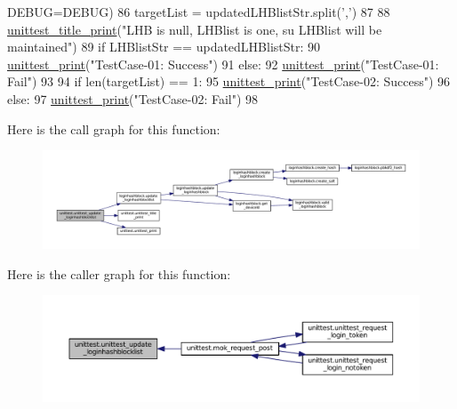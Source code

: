 \begin{DoxyCode}
      DEBUG=DEBUG)
86     targetList = updatedLHBlistStr.split(\textcolor{stringliteral}{','})
87 
88     \hyperlink{namespaceunittest_a642ec5401fe406315f1489d237ba826e}{unittest\_title\_print}(\textcolor{stringliteral}{"LHB is null, LHBlist is one, su LHBlist will be maintained"})
89     \textcolor{keywordflow}{if} LHBlistStr == updatedLHBlistStr:
90         \hyperlink{namespaceunittest_a217a1a3af5bc9748f2f6194bf79402bc}{unittest\_print}(\textcolor{stringliteral}{"TestCase-01: Success"})
91     \textcolor{keywordflow}{else}:
92         \hyperlink{namespaceunittest_a217a1a3af5bc9748f2f6194bf79402bc}{unittest\_print}(\textcolor{stringliteral}{"TestCase-01: Fail"})
93 
94     \textcolor{keywordflow}{if} len(targetList) == 1:
95         \hyperlink{namespaceunittest_a217a1a3af5bc9748f2f6194bf79402bc}{unittest\_print}(\textcolor{stringliteral}{"TestCase-02: Success"})
96     \textcolor{keywordflow}{else}:
97         \hyperlink{namespaceunittest_a217a1a3af5bc9748f2f6194bf79402bc}{unittest\_print}(\textcolor{stringliteral}{"TestCase-02: Fail"})
98 
\end{DoxyCode}


Here is the call graph for this function\+:\nopagebreak
\begin{figure}[H]
\begin{center}
\leavevmode
\includegraphics[width=350pt]{namespaceunittest_a9e16eaba67b93461be6ea8ef6332507a_cgraph}
\end{center}
\end{figure}




Here is the caller graph for this function\+:\nopagebreak
\begin{figure}[H]
\begin{center}
\leavevmode
\includegraphics[width=350pt]{namespaceunittest_a9e16eaba67b93461be6ea8ef6332507a_icgraph}
\end{center}
\end{figure}




